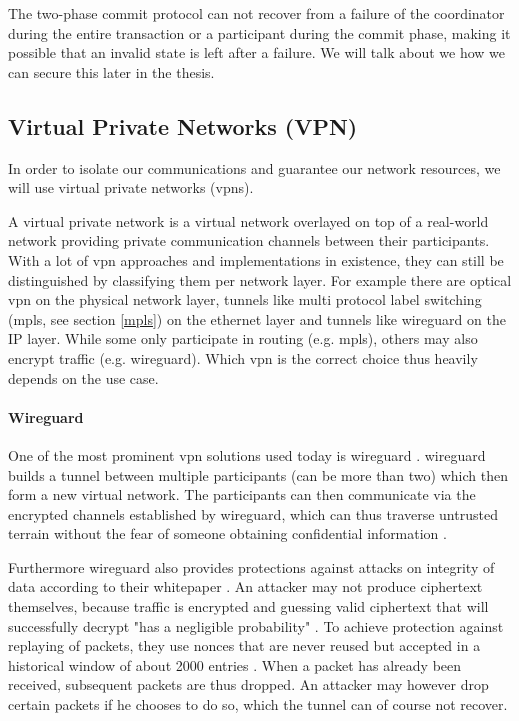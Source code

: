 The two-phase commit protocol can not recover from a failure of the coordinator during the entire transaction or a participant during the commit phase, making it possible that an invalid state is left after a failure. We will talk about we how we can secure this later in the thesis.

\subsection{Virtual Private Networks (VPN)}
In order to isolate our communications and guarantee our network resources, we will use virtual private networks (\acrshort{vpn}s).

A virtual private network \cite{vpn} is a virtual network overlayed on top of a real-world network providing private communication channels between their participants. With a lot of \acrshort{vpn} approaches and implementations in existence, they can still be distinguished by classifying them per network layer. For example there are optical \acrshort{vpn} on the physical network layer, tunnels like multi protocol label switching (\acrshort{mpls}, see section \ref{mpls}) on the ethernet layer and tunnels like \gls{wireguard} \cite{wireguard} on the IP layer. While some only participate in routing (e.g. \acrshort{mpls}), others may also encrypt traffic (e.g. \gls{wireguard}). Which \acrshort{vpn} is the correct choice thus heavily depends on the use case.

\paragraph{Wireguard} One of the most prominent \acrshort{vpn} solutions used today is \gls{wireguard} \cite{wireguard}. \Gls{wireguard} builds a tunnel between multiple participants (can be more than two) which then form a new virtual network. The participants can then communicate via the encrypted channels established by \gls{wireguard}, which can thus traverse untrusted terrain without the fear of someone obtaining confidential information \cite{wireguard}.

Furthermore \gls{wireguard} also provides protections against attacks on integrity of data according to their whitepaper \cite{wireguard}. An attacker may not produce ciphertext themselves, because traffic is encrypted and guessing valid ciphertext that will successfully decrypt "has a negligible probability" \cite{wireguardcrypto}. To achieve protection against replaying of packets, they use nonces that are never reused but accepted in a historical window of about 2000 entries \cite{wireguardproto}. When a packet has already been received, subsequent packets are thus dropped. An attacker may however drop certain packets if he chooses to do so, which the tunnel can of course not recover.

